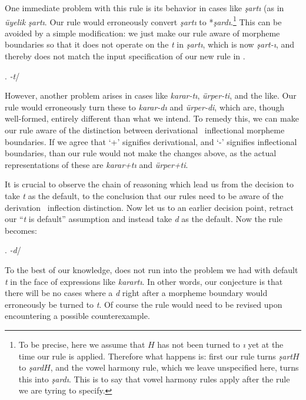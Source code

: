 \documentclass[11pt]{article}
\newcommand{\morphrule}[3]{{\it#1}\hspace{10pt}\sysm{\imp}\hspace{10pt}{\it#2}\hspace{10pt}/\hspace{10pt}{\it#3}}
\begin{document}
{\item One immediate problem with this rule is its behavior in cases like
\emph{\c sart\i} (as in \emph{\"uyelik \c sart\i}. Our rule would erroneously
convert \emph{\c sart\i} to *\emph{\c sard\i}.\footnote{To be precise, here we
assume that $H$ has not been turned to \emph{\i} yet at the time our rule is
applied. Therefore what happens is: first our rule turns \emph{\c sart$H$} to
\emph{\c sard$H$}, and the vowel harmony rule, which we leave unspecified here,
turns this into \emph{\c sard\i}. This is to say that vowel harmony rules apply
after the rule we are tyring to specify.} This can be avoided by a
simple modification:  we just make our rule aware of morpheme boundaries so that
it does not operate on the \emph{t} in \emph{\c sart\i}, which is now \emph{\c
sart-\i}, and thereby does not match the input specification of our new rule in
.


\ex.\label{new} \morphrule{-t}{-d}{$V$ {\rm or} $C -$ $\{$p,\c c,t,k,s,\c s,f,h$\}$\cntx$H$}


\item However, another problem arises in cases like \emph{karar-t\i},
\emph{\"urper-ti}, and the like. Our rule would erroneously turn these to \emph{karar-d\i} and
\emph{\"urper-di}, which are, though well-formed, entirely different than what
we intend. To remedy this, we can make our rule aware of the distinction between
derivational \versus\ inflectional morpheme boundaries. If we agree that `+'
signifies derivational, and `-' signifies inflectional boundaries, than our rule
would not make the changes above, as the actual representations of these are
\emph{karar+t\i} and \emph{\"urper+ti}.

\item It is crucial to observe the chain of reasoning which lead us from the
decision to take \emph{t} as the default, to the conclusion that our rules need to be
aware of the derivation \versus\ inflection distinction. Now let us
 to an earlier decision point, retract our ``\emph{t} is
default'' assumption and instead take \emph{d} as the default.  Now the rule
becomes:


\ex.\label{dasdefault} \morphrule{-d}{-t}{$\{$p,\c c,t,k,s,\c s,f,h$\}$\cntx$H$}


\item To the best of our knowledge,  does not run into the
problem we had with default \emph{t} in the face of expressions like
\emph{karart\i}. In other words, our conjecture is that there will be no cases
where a \emph{d} right after a morpheme boundary would erroneously be turned to
\emph{t}. Of course the rule would need to be revised upon encountering a
possible counterexample.

}
\end{document}
